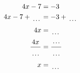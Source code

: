 \documentclass[12pt]{article}
\begin{document}
\begin{multicols}{2}
\begin{minipage}[t]{0.45\textwidth}
    \raggedright %
    \begin{align*} %
        4x - 7 &= -3\\
        4x - 7 + \dotuline{\hspace{5mm}} &= -3 + \dotuline{\hspace{5mm}}\\
        4x &= \dotuline{\hspace{5mm}}\\
        \frac{4x}{\dotuline{\hspace{5mm}}} &= \frac{\dotuline{\hspace{5mm}}}{\dotuline{\hspace{5mm}}}\\
        x &= \dotuline{\hspace{5mm}}\\
    \end{align*}
\end{minipage}\newpage

\end{multicols}
\end{document}

